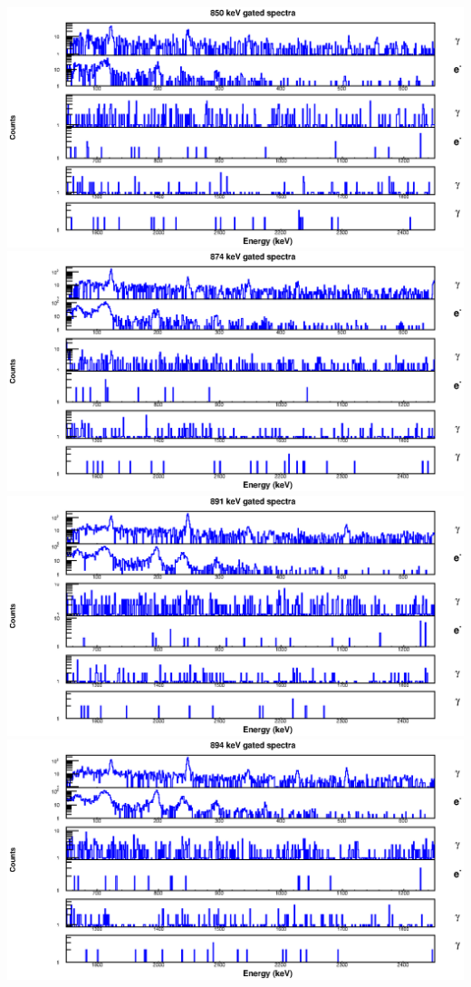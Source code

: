 \begin{landscape}
\includegraphics[scale=1.2]{154Gd_Appendix/850_combined.eps}
\includegraphics[scale=1.2]{154Gd_Appendix/874_combined.eps}
\includegraphics[scale=1.2]{154Gd_Appendix/891_combined.eps}
\includegraphics[scale=1.2]{154Gd_Appendix/894_combined.eps}

\end{landscape}
